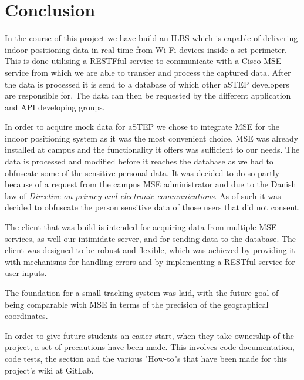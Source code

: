 \chapter{Conclusion}
In the course of this project we have build an ILBS which is capable of delivering indoor positioning data in real-time from Wi-Fi devices inside a set perimeter. This is done utilising a RESTFful service to communicate with a Cisco MSE service from which we are able to transfer and process the captured data. After the data is processed it is send to a database of which other aSTEP developers are responsible for. The data can then be requested by the different application and API developing groups.

In order to acquire mock data for aSTEP we chose to integrate MSE for the indoor positioning system as it was the most convenient choice. MSE was already installed at campus and the functionality it offers was sufficient to our needs. The data is processed and modified before it reaches the database as we had to obfuscate some of the sensitive personal data. It was decided to do so partly because of a request from the campus MSE administrator and due to the Danish law of \textit{Directive on privacy and electronic communications}. As of such it was decided to obfuscate the person sensitive data of those users that did not consent.

The client that was build is intended for acquiring data from multiple MSE services, as well our intimidate server, and for sending data to the database. The client was designed to be robust and flexible, which was achieved by providing it with mechanisms for handling errors and by implementing a RESTful service for user inputs. 

The foundation for a small tracking system was laid, with the future goal of being comparable with MSE in terms of the precision of the geographical coordinates. %

In order to give future students an easier start, when they take ownership of the project, a set of precautions have been made. This involves code documentation, code tests, the section  and the various "How-to"s that have been made for this project's wiki at GitLab. 

